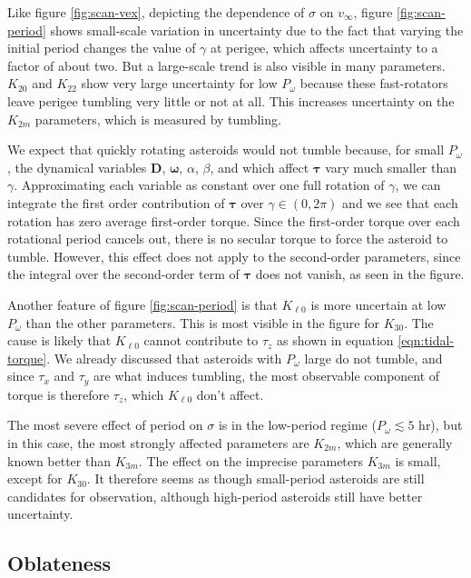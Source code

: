 \documentclass[fleqn,usenatbib]{mnras}
\begin{document}
Like figure \ref{fig:scan-vex}, depicting the dependence of $\sigma$ on $v_\infty$, figure \ref{fig:scan-period} shows small-scale variation in uncertainty due to the fact that varying the initial period changes the value of $\gamma$ at perigee, which affects uncertainty to a factor of about two. But a large-scale trend is also visible in many parameters. $K_{20}$ and $K_{22}$ show very large uncertainty for low $P_\omega$ because these fast-rotators leave perigee tumbling very little or not at all. This increases uncertainty on the $K_{2m}$ parameters, which is measured by tumbling.

We expect that quickly rotating asteroids would not tumble because, for small $P_\omega$, the dynamical variables $\bm D$, $\bm \omega$, $\alpha$, $\beta$, and which affect $\bm \tau$ vary much smaller than $\gamma$. Approximating each variable as constant over one full rotation of $\gamma$, we can integrate the first order contribution of $\bm \tau$ over $\gamma \in (0, 2\pi)$ and we see that each rotation has zero average first-order torque. Since the first-order torque over each rotational period cancels out, there is no secular torque to force the asteroid to tumble. However, this effect does not apply to the second-order parameters, since the integral over the second-order term of $\bm \tau$ does not vanish, as seen in the figure.

Another feature of figure \ref{fig:scan-period} is that $K_{\ell 0}$ is more uncertain at low $P_\omega$ than the other parameters. This is most visible in the figure for $K_{30}$. The cause is likely that $K_{\ell 0}$ cannot contribute to $\tau_z$ as shown in equation \ref{eqn:tidal-torque}. We already discussed that asteroids with $P_\omega$ large do not tumble, and since $\tau_x$ and $\tau_y$ are what induces tumbling, the most observable component of torque is therefore $\tau_z$, which $K_{\ell 0}$ don't affect.

The most severe effect of period on $\sigma$ is in the low-period regime ($P_\omega \lesssim 5$ hr), but in this case, the most strongly affected parameters are $K_{2m}$, which are generally known better than $K_{3m}$. The effect on the imprecise parameters $K_{3m}$ is small, except for $K_{30}$. It therefore seems as though small-period asteroids are still candidates for observation, although high-period asteroids still have better uncertainty.


\subsection{Oblateness}
\label{sec:scan-oblateness}
\end{document}
